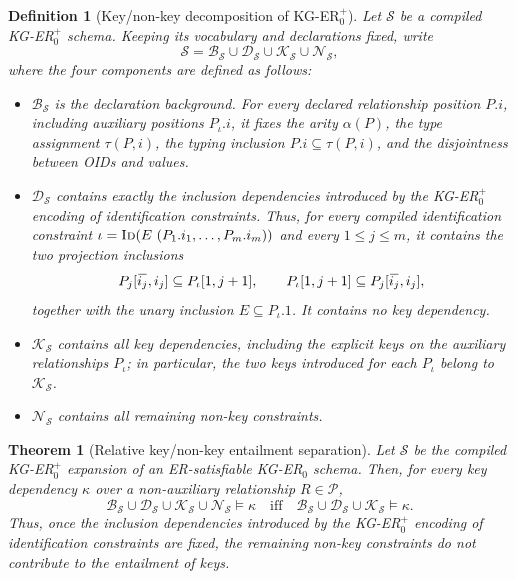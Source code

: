 \documentclass[10pt]{article}
\newtheorem{definition}{Definition}
\newtheorem{theorem}{Theorem}
\newcommand{\ols}[1]{\mskip.5\thinmuskip\overline{\mskip-.5\thinmuskip {#1} \mskip-.5\thinmuskip}\mskip.5\thinmuskip} %
\begin{document}
\begin{definition}[Key/non-key decomposition of KG-ER\(_0^+\)]
Let \(\mathcal S\) be a compiled KG-ER\(_0^+\) schema.  Keeping its
vocabulary and declarations fixed, write
\[
\mathcal S=\mathcal B_{\mathcal S}\cup\mathcal D_{\mathcal S}\cup
\mathcal K_{\mathcal S}\cup\mathcal N_{\mathcal S},
\]
where the four components are defined as follows:
\begin{itemize}
\item \(\mathcal B_{\mathcal S}\) is the declaration background.  For
every declared relationship position \(P.i\), including auxiliary
positions \(P_\iota.i\), it fixes the arity \(\alpha(P)\), the type
assignment \(\tau(P,i)\), the typing inclusion
\(P.i\subseteq\tau(P,i)\), and the disjointness between OIDs and
values.
\item \(\mathcal D_{\mathcal S}\) contains exactly the inclusion
dependencies introduced by the KG-ER\(_0^+\) encoding of identification
constraints.  Thus, for every compiled identification constraint
\(\iota=\textsc{Id}(E\ (P_1.i_1,\ldots,P_m.i_m))\) and every
\(1\leq j\leq m\), it contains the two projection inclusions
\[
P_j[\ols{i_j},i_j]\subseteq P_\iota[1,j+1],
\qquad
P_\iota[1,j+1]\subseteq P_j[\ols{i_j},i_j],
\]
together with the unary inclusion \(E\subseteq P_\iota.1\).  It contains
no key dependency.
\item \(\mathcal K_{\mathcal S}\) contains all key dependencies,
including the explicit keys on the auxiliary relationships \(P_\iota\);
in particular, the two keys introduced for each \(P_\iota\) belong to
\(\mathcal K_{\mathcal S}\).
\item \(\mathcal N_{\mathcal S}\) contains all remaining non-key
constraints.
\end{itemize}
\end{definition}

\begin{theorem}[Relative key/non-key entailment separation]
\label{thm:kger-pure-key-separation}
Let \(\mathcal S\) be the compiled KG-ER\(_0^+\) expansion of an
ER-satisfiable KG-ER\(_0\) schema.  Then, for every key dependency
\(\kappa\) over a non-auxiliary
relationship \(R\in\mathcal P\),
\[
\mathcal B_{\mathcal S}\cup\mathcal D_{\mathcal S}\cup
\mathcal K_{\mathcal S}\cup\mathcal N_{\mathcal S}\models\kappa
\quad\text{iff}\quad
\mathcal B_{\mathcal S}\cup\mathcal D_{\mathcal S}\cup
\mathcal K_{\mathcal S}\models\kappa .
\]
Thus, once the inclusion dependencies introduced by the KG-ER\(_0^+\)
encoding of identification constraints are fixed, the remaining non-key
constraints do not contribute to the entailment of keys.
\end{theorem}
\end{document}
